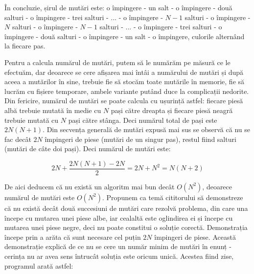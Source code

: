 În concluzie, șirul de mutări este: o împingere - un salt - o împingere - două
salturi - o împingere - trei salturi - ... - o împingere - $N-1$ salturi - o
împingere - $N$ salturi - o împingere - $N-1$ salturi - ... - o împingere -
trei salturi - o împingere - două salturi - o împingere - un salt - o
împingere, culorile alternând la fiecare pas.

Pentru a calcula numărul de mutări, putem să le numărăm pe măsură ce le
efectuăm, dar deoarece se cere afișarea mai întâi a numărului de mutări și
după aceea a mutărilor în sine, trebuie fie să stocăm toate mutările în
memorie, fie să lucrăm cu fișiere temporare, ambele variante putând duce la
complicații nedorite. Din fericire, numărul de mutări se poate calcula cu
ușurință astfel: fiecare piesă albă trebuie mutată în medie cu $N$ pași către
dreapta și fiecare piesă neagră trebuie mutată cu $N$ pași către stânga. Deci
numărul total de pași este $2N(N+1).$ Din secvența generală de mutări expusă
mai sus se observă că nu se fac decât $2N$ împingeri de piese (mutări de un
singur pas), restul fiind salturi (mutări de câte doi pași). Deci numărul de
mutări este:

\begin{equation}
  2N + \frac{2N(N + 1) - 2N}{2} = 2N + N^2 = N(N + 2)
\end{equation}

De aici deducem că nu există un algoritm mai bun decât $O(N^2)$, deoarece
numărul de mutări este $O(N^2)$. Propunem ca temă cititorului să demonstreze
că nu există decât două succesiuni de mutări care rezolvă problema, din care
una începe cu mutarea unei piese albe, iar cealaltă este oglindirea ei și
începe cu mutarea unei piese negre, deci nu poate constitui o soluție
corectă. Demonstrația începe prin a arăta că sunt necesare cel puțin $2N$
împingeri de piese. Această demonstrație explică de ce nu se cere un număr
minim de mutări în enunț - cerința nu ar avea sens întrucât soluția este
oricum unică.  Acestea fiind zise, programul arată astfel:

\inputminted{c}{src/problem1.c}
